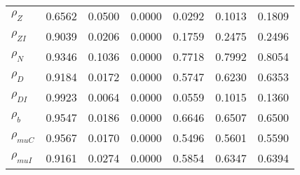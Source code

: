 \begin{center}
\begin{longtable}{lcccccc}
$ {\rho_Z}             $	 & 	          0.6562	 & 	          0.0500	 & 	          0.0000	 & 	          0.0292	 & 	          0.1013	 & 	          0.1809 \\ 
$ {\rho_{ZI}}          $	 & 	          0.9039	 & 	          0.0206	 & 	          0.0000	 & 	          0.1759	 & 	          0.2475	 & 	          0.2496 \\ 
$ {\rho_N}             $	 & 	          0.9346	 & 	          0.1036	 & 	          0.0000	 & 	          0.7718	 & 	          0.7992	 & 	          0.8054 \\ 
$ {\rho_D}             $	 & 	          0.9184	 & 	          0.0172	 & 	          0.0000	 & 	          0.5747	 & 	          0.6230	 & 	          0.6353 \\ 
$ {\rho_{DI}}          $	 & 	          0.9923	 & 	          0.0064	 & 	          0.0000	 & 	          0.0559	 & 	          0.1015	 & 	          0.1360 \\ 
$ {\rho_b}             $	 & 	          0.9547	 & 	          0.0186	 & 	          0.0000	 & 	          0.6646	 & 	          0.6507	 & 	          0.6500 \\ 
$ {\rho_{muC}}         $	 & 	          0.9567	 & 	          0.0170	 & 	          0.0000	 & 	          0.5496	 & 	          0.5601	 & 	          0.5590 \\ 
$ {\rho_{muI}}         $	 & 	          0.9161	 & 	          0.0274	 & 	          0.0000	 & 	          0.5854	 & 	          0.6347	 & 	          0.6394 \\ 
\end{longtable}
 \end{center}
